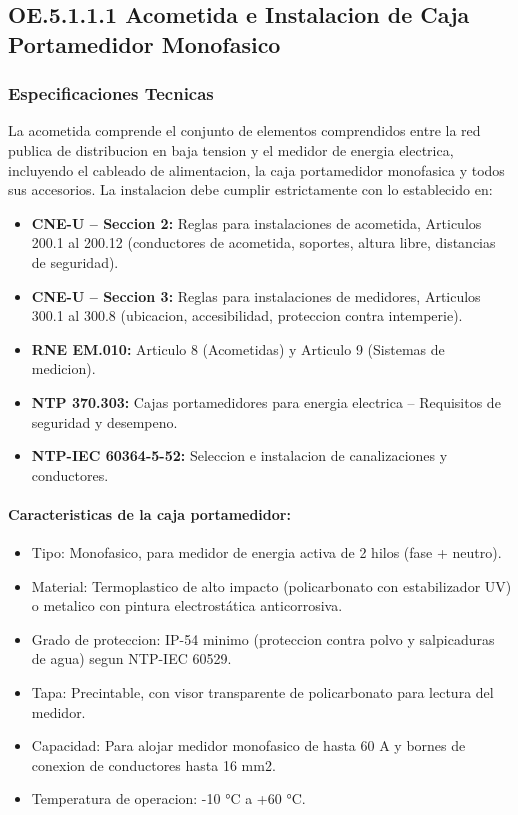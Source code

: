 \subsection{OE.5.1.1.1 Acometida e Instalacion de Caja Portamedidor Monofasico}

\subsubsection{Especificaciones Tecnicas}

La acometida comprende el conjunto de elementos comprendidos entre la red publica de distribucion en baja tension y el medidor de energia electrica, incluyendo el cableado de alimentacion, la caja portamedidor monofasica y todos sus accesorios. La instalacion debe cumplir estrictamente con lo establecido en:

\begin{itemize}
  \item \textbf{CNE-U -- Seccion 2:} Reglas para instalaciones de acometida, Articulos 200.1 al 200.12 (conductores de acometida, soportes, altura libre, distancias de seguridad).
  \item \textbf{CNE-U -- Seccion 3:} Reglas para instalaciones de medidores, Articulos 300.1 al 300.8 (ubicacion, accesibilidad, proteccion contra intemperie).
  \item \textbf{RNE EM.010:} Articulo 8 (Acometidas) y Articulo 9 (Sistemas de medicion).
  \item \textbf{NTP 370.303:} Cajas portamedidores para energia electrica -- Requisitos de seguridad y desempeno.
  \item \textbf{NTP-IEC 60364-5-52:} Seleccion e instalacion de canalizaciones y conductores.
\end{itemize}

\paragraph{Caracteristicas de la caja portamedidor:}
\begin{itemize}[nosep]
  \item Tipo: Monofasico, para medidor de energia activa de 2 hilos (fase + neutro).
  \item Material: Termoplastico de alto impacto (policarbonato con estabilizador UV) o metalico con pintura electrostática anticorrosiva.
  \item Grado de proteccion: IP-54 minimo (proteccion contra polvo y salpicaduras de agua) segun NTP-IEC 60529.
  \item Tapa: Precintable, con visor transparente de policarbonato para lectura del medidor.
  \item Capacidad: Para alojar medidor monofasico de hasta 60 A y bornes de conexion de conductores hasta 16 mm2.
  \item Temperatura de operacion: -10 °C a +60 °C.
\end{itemize}

